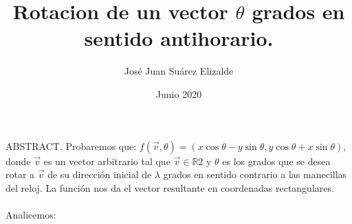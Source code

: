 \documentclass{article}
\title{\textbf{Rotacion de un vector \begin{math}\theta \end{math} grados en sentido antihorario.}}
\author{José Juan Suárez Elizalde}
\date{Junio 2020}
\begin{document}
\maketitle
{\selectfont
ABSTRACT. 
}
Probaremos que: \begin{math} f(\overrightarrow{v},\theta)=(x\cos\theta -y\sin\theta,y\cos\theta+x\sin\theta)\end{math},
    donde \begin{math} \overrightarrow{v}\end{math} es un vector arbitrario tal que \begin{math}\overrightarrow{v}\in \mathbb{R}2 \end{math} y  \begin{math}\theta\end{math} es los grados que se desea rotar a \begin{math}\overrightarrow{v}\end{math} de su dirección inicial de \begin{math}\lambda\end{math} grados en sentido contrario a las manecillas del reloj. La función nos da el vector resultante en coordenadas rectangulares.
    \\\\
Analicemos:
\end{document}
